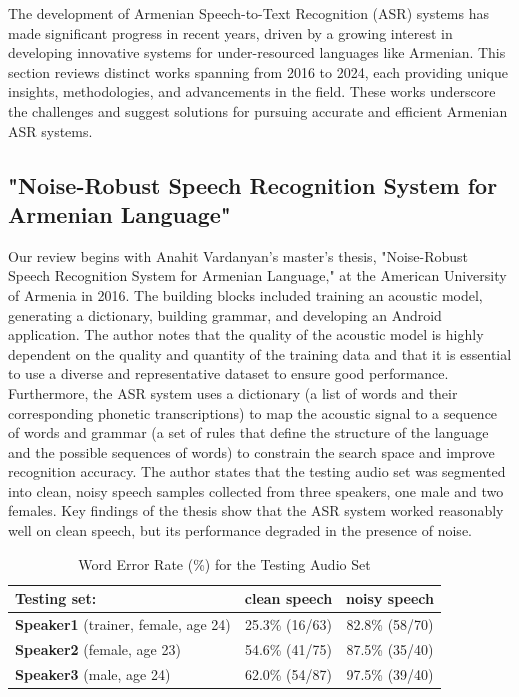 \documentclass[conference]{IEEEtran}
\begin{document}
The development of Armenian Speech-to-Text Recognition (ASR) systems has made significant progress in recent years, driven by a growing interest in developing innovative systems for under-resourced languages like Armenian. This section reviews distinct works spanning from 2016 to 2024, each providing unique insights, methodologies, and advancements in the field. These works underscore the challenges and suggest solutions for pursuing accurate and efficient Armenian ASR systems.

\subsection{"Noise-Robust Speech Recognition System for Armenian Language"\cite{author2023noise}} 
Our review begins with Anahit Vardanyan's master's thesis, "Noise-Robust Speech Recognition System for Armenian Language," at the American University of Armenia in 2016. The building blocks included training an acoustic model, generating a dictionary, building grammar, and developing an Android application. The author notes that the quality of the acoustic model is highly dependent on the quality and quantity of the training data and that it is essential to use a diverse and representative dataset to ensure good performance. Furthermore, the ASR system uses a dictionary (a list of words and their corresponding phonetic transcriptions) to map the acoustic signal to a sequence of words and grammar (a set of rules that define the structure of the language and the possible sequences of words) to constrain the search space and improve recognition accuracy. The author states that the testing audio set was segmented into clean, noisy speech samples collected from three speakers, one male and two females. Key findings of the thesis show that the ASR system worked reasonably well on clean speech, but its performance degraded in the presence of noise. 

\begin{table}[h]
    \centering
    \caption{Word Error Rate (\%) for the Testing Audio Set}
    \label{tab:wer_database}
    \begin{tabular}{lcc}
        \toprule
        \textbf{Testing set}: & \textbf{clean speech} & \textbf{noisy speech} \\
        \midrule
        \textbf{Speaker1} (trainer, female, age 24) & 25.3\% (16/63) & 82.8\% (58/70) \\
        \textbf{Speaker2} (female, age 23) & 54.6\% (41/75) & 87.5\% (35/40) \\
        \textbf{Speaker3} (male, age 24) & 62.0\% (54/87) & 97.5\% (39/40) \\
        \midrule
    \end{tabular}
\end{table}
\end{document}
